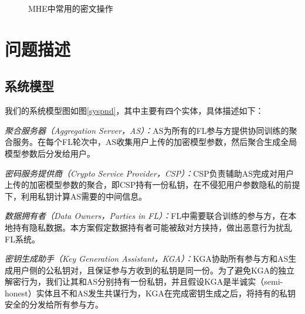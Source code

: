 \begin{figure}[!htb]
	\caption{MHE中常用的密文操作}
	\label{f1}
\end{figure}


\section{问题描述}\label{ps}

\subsection{系统模型}
我们的系统模型图如图\ref{syspnd}，其中主要有四个实体，具体描述如下：
\begin{compactitem}
	\item \textit{聚合服务器（Aggregation Server，AS）：}AS为所有的FL参与方提供协同训练的聚合服务。在每个FL轮次中，AS收集用户上传的加密模型参数，然后聚合生成全局模型参数后分发给用户。
	\item \textit{密码服务提供商（Crypto Service Provider，CSP）：}CSP负责辅助AS完成对用户上传的加密模型参数的聚合，即CSP持有一份私钥，在不侵犯用户参数隐私的前提下，利用私钥计算AS需要的中间信息。
	\item \textit{数据拥有者（Data Owners，Parties in FL）：}FL中需要联合训练的参与方，在本地持有隐私数据。本方案假定数据持有者可能被敌对方挟持，做出恶意行为扰乱FL系统。
	\item \textit{密钥生成助手（Key Generation Assistant，KGA）：}KGA协助所有参与方和AS生成用户侧的公私钥对，且保证参与方收到的私钥是同一份。为了避免KGA的独立解密行为，我们让其和AS分别持有一份私钥，并且假设KGA是半诚实（semi-honest）实体且不和AS发生共谋行为，KGA在完成密钥生成之后，将持有的私钥安全的分发给所有参与方。
\end{compactitem}

